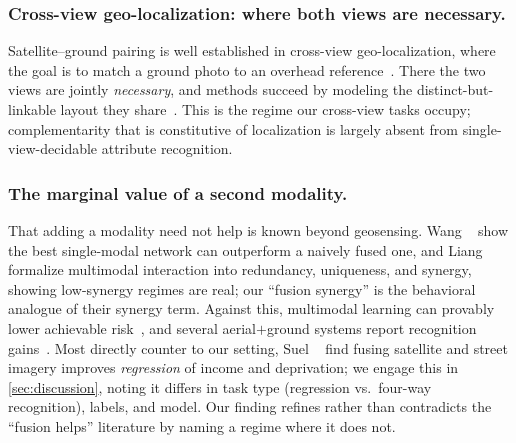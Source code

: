 \subsubsection{Cross-view geo-localization: where both views are necessary.}
Satellite--ground pairing is well established in cross-view geo-localization, where
the goal is to match a ground photo to an overhead
reference~\cite{durgam2024crossview,zhai2017predicting,zhu2021vigor}. There the two
views are jointly \emph{necessary}, and methods succeed by modeling the
distinct-but-linkable layout they share~\cite{zhang2023geodtr}. This is the regime
our cross-view tasks occupy; complementarity that is constitutive of localization
is largely absent from single-view-decidable attribute recognition.

\subsubsection{The marginal value of a second modality.}
That adding a modality need not help is known beyond geosensing. Wang
\etal~\cite{wang2020multimodal} show the best single-modal network can outperform a
naively fused one, and Liang \etal~\cite{liang2023quantifying} formalize multimodal
interaction into redundancy, uniqueness, and synergy, showing low-synergy regimes are
real; our ``fusion synergy'' is the behavioral analogue of their synergy term.
Against this, multimodal learning can provably lower achievable
risk~\cite{huang2021makes}, and several aerial$+$ground systems report recognition
gains~\cite{workman2017unified,machado2021airound}. Most directly counter to our
setting, Suel \etal~\cite{suel2021multimodal} find fusing satellite and street
imagery improves \emph{regression} of income and deprivation; we engage this in
\cref{sec:discussion}, noting it differs in task type (regression vs.\ four-way
recognition), labels, and model. Our finding refines rather than contradicts the
``fusion helps'' literature by naming a regime where it does not.

